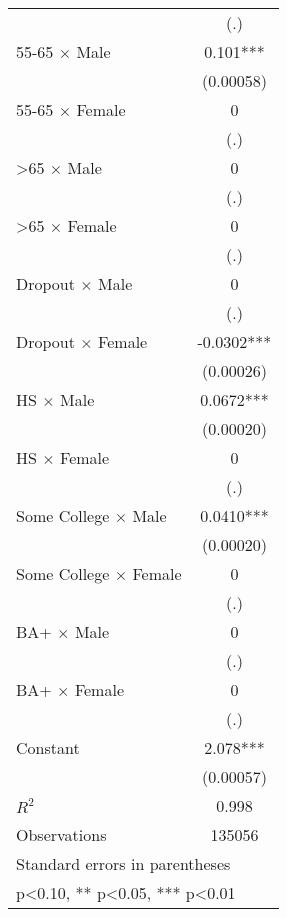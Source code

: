\begin{table}[htbp]
\begin{tabular}{l*{1}{c}}
                    &         (.)   \\
55-65 $\times$ Male &       0.101***\\
                    &   (0.00058)   \\
55-65 $\times$ Female&           0   \\
                    &         (.)   \\
>65 $\times$ Male   &           0   \\
                    &         (.)   \\
>65 $\times$ Female &           0   \\
                    &         (.)   \\
Dropout $\times$ Male&           0   \\
                    &         (.)   \\
Dropout $\times$ Female&     -0.0302***\\
                    &   (0.00026)   \\
HS $\times$ Male    &      0.0672***\\
                    &   (0.00020)   \\
HS $\times$ Female  &           0   \\
                    &         (.)   \\
Some College $\times$ Male&      0.0410***\\
                    &   (0.00020)   \\
Some College $\times$ Female&           0   \\
                    &         (.)   \\
BA+ $\times$ Male   &           0   \\
                    &         (.)   \\
BA+ $\times$ Female &           0   \\
                    &         (.)   \\
Constant            &       2.078***\\
                    &   (0.00057)   \\
\midrule
\(R^{2}\)           &       0.998   \\
Observations        &      135056   \\
\bottomrule
\multicolumn{2}{l}{\footnotesize Standard errors in parentheses}\\
\multicolumn{2}{l}{\footnotesize * p<0.10, ** p<0.05, *** p<0.01}\\
\end{tabular}
\end{table}
